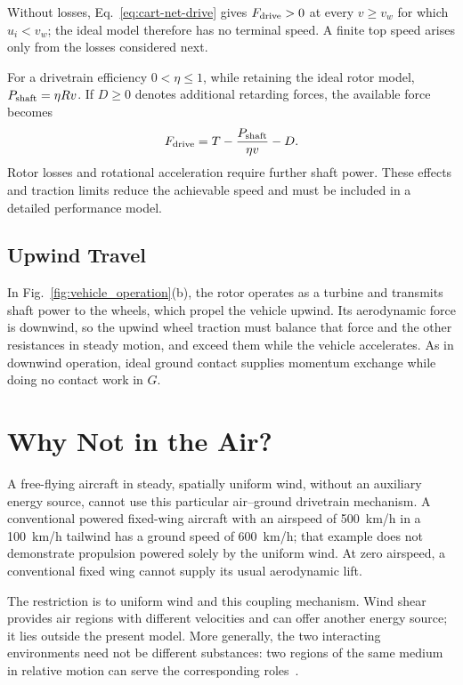 \documentclass[reprint,aps,pra,longbibliography]{revtex4-2}
\begin{document}
Without losses, Eq.~\eqref{eq:cart-net-drive} gives \(F_{\rm drive}>0\) at every \(v\geq v_w\) for which \(u_i<v_w\); the ideal model therefore has no terminal speed. A finite top speed arises only from the losses considered next.

For a drivetrain efficiency \(0<\eta\leq1\), while retaining the ideal rotor model, \(P_{\rm shaft}=\eta Rv\). If \(D\geq0\) denotes additional retarding forces, the available force becomes
\begin{equation}
F_{\rm drive}=T-\frac{P_{\rm shaft}}{\eta v}-D.
\label{eq:cart-losses}
\end{equation}
Rotor losses and rotational acceleration require further shaft power. These effects and traction limits reduce the achievable speed and must be included in a detailed performance model.


\subsection{Upwind Travel}


In Fig.~\ref{fig:vehicle_operation}(b), the rotor operates as a turbine and transmits shaft power to the wheels, which propel the vehicle upwind. Its aerodynamic force is downwind, so the upwind wheel traction must balance that force and the other resistances in steady motion, and exceed them while the vehicle accelerates. As in downwind operation, ideal ground contact supplies momentum exchange while doing no contact work in \(G\).


\section{Why Not in the Air?}
\label{wind:whynotintheair}


A free-flying aircraft in steady, spatially uniform wind, without an auxiliary energy source, cannot use this particular air--ground drivetrain mechanism. A conventional powered fixed-wing aircraft with an airspeed of \SI{500}{km/h} in a \SI{100}{km/h} tailwind has a ground speed of \SI{600}{km/h}; that example does not demonstrate propulsion powered solely by the uniform wind. At zero airspeed, a conventional fixed wing cannot supply its usual aerodynamic lift.

The restriction is to uniform wind and this coupling mechanism. Wind shear provides air regions with different velocities and can offer another energy source; it lies outside the present model. More generally, the two interacting environments need not be different substances: two regions of the same medium in relative motion can serve the corresponding roles~\cite{Gaunaa2009}.
\end{document}
